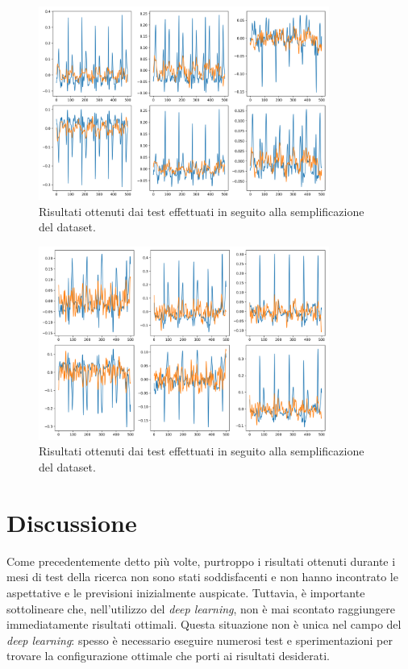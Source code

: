\documentclass[12pt,italian]{report}
\begin{document}
\begin{figure}[H]
    \centering
    \includegraphics[width=0.85\textwidth]{immagini/seconda_cnn_risultati_secondo_plot_0.png}
    \captionsetup{justification=centering}
    \caption{Risultati ottenuti dai test effettuati in seguito alla semplificazione del dataset.}
    \label{fig:seconda_cnn_risultati_secondo_plot_0}
\end{figure}
\begin{figure}[H]
    \centering
    \includegraphics[width=0.85\textwidth]{immagini/seconda_cnn_risultati_secondo_plot_1.png}
    \captionsetup{justification=centering}
    \caption{Risultati ottenuti dai test effettuati in seguito alla semplificazione del dataset.}
    \label{fig:seconda_cnn_risultati_secondo_plot_1}
\end{figure}

\section{Discussione}
\label{sec:discussione}

Come precedentemente detto più volte, purtroppo i risultati ottenuti durante i mesi di test della ricerca non sono stati soddisfacenti e non hanno incontrato le aspettative e le previsioni inizialmente auspicate. Tuttavia, è importante sottolineare che, nell'utilizzo del \textit{deep learning}, non è mai scontato raggiungere immediatamente risultati ottimali. Questa situazione non è unica nel campo del \textit{deep learning}: spesso è necessario eseguire numerosi test e sperimentazioni per trovare la configurazione ottimale che porti ai risultati desiderati.
\end{document}
